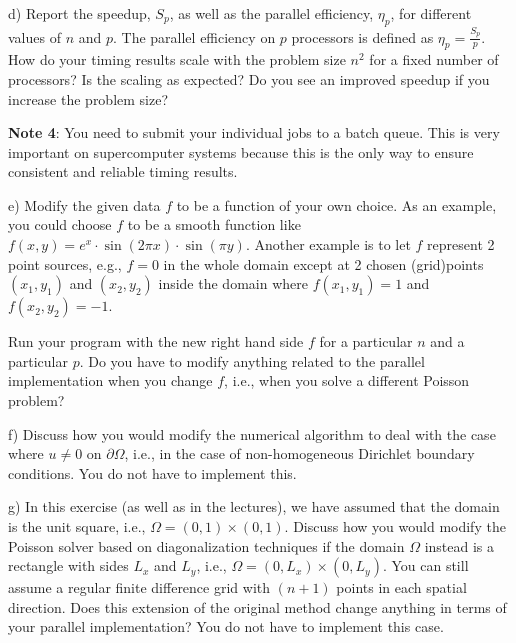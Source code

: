 \documentclass[11pt]{article}
\begin{document}
\begin{description}
\newpage

\item d) Report the speedup, $S_p$, as well as the parallel efficiency, $\eta_p$, for 
different values of $n$ and $p$. 
The parallel efficiency on $p$ processors is defined as $\eta_p = \frac{S_p}{p}$. \\
How do your timing results scale with the problem size 
$n^2$ for a fixed number of processors? Is the scaling as expected?
Do you see an improved speedup if you increase the problem size? 

{\bf Note 4}: 
You need to submit your individual jobs to a batch queue. 
This is very important on supercomputer systems because this is the only way to ensure 
consistent and reliable timing results. 

\item e) Modify the given data $f$ to be a function of 
your own choice. As an example, you could choose $f$ to be 
a smooth function like 
$f(x,y) = e^{x}\cdot \sin(2\pi x)\cdot \sin(\pi y)$. 
Another example is to let $f$ represent 2 point sources,
e.g., $f=0$ in the whole domain except at 2 chosen (grid)points 
$(x_1,y_1)$ and $(x_2,y_2)$ inside the domain where 
$f(x_1,y_1) = 1$ and $f(x_2,y_2) = -1$. 

Run your program with the new 
right hand side $f$ for a particular $n$ and a particular $p$. 
Do you have to modify anything related to the parallel 
implementation when you change $f$, i.e., when you solve 
a different Poisson problem?

\item f) Discuss how you would modify the numerical 
algorithm to deal with the case where $u\neq 0$ on 
$\partial\Omega$, i.e., in the case of non-homogeneous 
Dirichlet boundary conditions. You do not have to implement this.

\item g) In this exercise (as well as in the lectures), 
we have assumed that the domain is the unit square,
i.e., $\Omega = (0,1)\times (0,1)$. 
Discuss how you would modify the Poisson solver based
on diagonalization techniques if the domain $\Omega$ instead 
is a rectangle with sides $L_x$ and $L_y$, i.e.,
$\Omega = (0,L_x)\times (0,L_y)$.
You can still assume a regular finite difference grid with 
$(n+1)$ points in each spatial direction. Does this extension 
of the original method change anything in terms of your 
parallel implementation? You do not have to implement this case.

\end{description}
\end{document}
